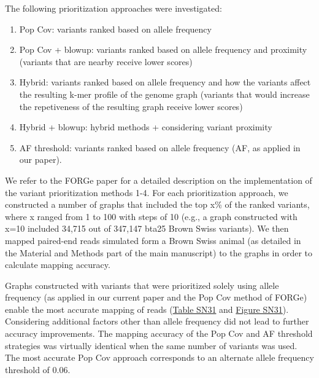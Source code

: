 \documentclass[../main.tex]{subfiles}
\begin{document}
\begin{flushleft}
The following prioritization approaches were investigated:
\begin{enumerate}
    \item  Pop Cov: variants ranked based on allele frequency
    \item  Pop Cov + blowup: variants ranked based on allele frequency and proximity (variants that are nearby receive lower scores)
    \item Hybrid: variants ranked based on allele frequency and how the variants affect the resulting k-mer profile of the genome graph (variants that would increase the
    repetiveness of the resulting graph receive lower scores)
    \item Hybrid + blowup: hybrid methods + considering variant proximity
    \item AF threshold: variants ranked based on allele frequency (AF, as applied in our paper).
\end{enumerate}

\bigskip

We refer to the FORGe paper \citep{pritt2018forge} for a detailed description on the
implementation of the variant prioritization methods 1-4.
For each prioritization approach, we constructed a number of graphs that included the top x\% of the ranked variants, where x ranged from 1 to 100 with steps of 10 (e.g., a graph constructed with x=10 included 34,715 out of 347,147 bta25 Brown Swiss variants). We then mapped paired-end reads simulated form a Brown Swiss animal (as detailed in the Material and Methods part of the main manuscript) to the graphs in order to calculate mapping accuracy.
\bigskip

Graphs constructed with variants that were prioritized solely using allele frequency (as applied in our current paper and the Pop Cov method of FORGe) enable the most accurate mapping of reads (\hyperlink{Table SN31}{Table SN31} and \hyperlink{Figure SN31}{Figure SN31}). Considering additional factors other than allele frequency did not lead to further accuracy improvements. The mapping accuracy of the Pop Cov and AF threshold strategies was virtually identical when the same number of variants was used. The most accurate Pop Cov approach corresponds to an alternate allele frequency threshold of 0.06. 
\bigskip
\newpage


\end{flushleft}
\end{document}
